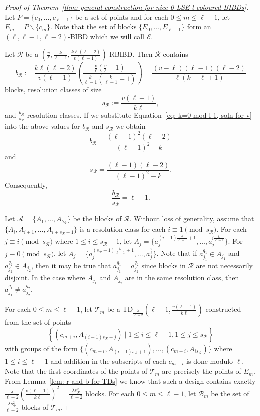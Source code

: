 \documentclass[12pt]{article}
\theoremstyle{definition}
\begin{document}
\begin{proof}[Proof of Theorem~\ref{thm: general construction for nice 0-LSE l-coloured BIBDs}]
    Let $P =\{c_0, \dots, c_{\ell-1}\}$ be a set of points and for each $0\leq m\leq \ell-1$, let $E_m=P\backslash\{c_m\}$. Note that the set of blocks $\{E_0, \dots, E_{\ell-1}\}$ form an $(\ell, \ell-1, \ell-2)$-BIBD which we will call $\mathcal{E}$.

    Let $\mathcal{R}$ be a $\left(\frac{v}{\ell}, \frac{k}{\ell-1}, \frac{k\ell(\ell-2)}{v(\ell-1)}\right)$-RBIBD. Then $\mathcal{R}$ contains \[b_{\mathcal{R}} := \frac{k\ell(\ell-2)}{v(\ell-1)}\left( \frac{\frac{v}{\ell}\left( \frac{v}{\ell} - 1\right)}{\frac{k}{\ell-1}\left( \frac{k}{\ell-1} - 1 \right)} \right) = \frac{(v-\ell)(\ell-1)(\ell-2)}{\ell(k-\ell+1)}\] blocks, resolution classes of size \[s_{\mathcal{R}} := \frac{v(\ell-1)}{k\ell},\] and $\frac{b_{\mathcal{R}}}{s_{\mathcal{R}}}$ resolution classes. If we substitute Equation~\eqref{eq: k=0 mod l-1, soln for v} into the above values for $b_{\mathcal{R}}$ and $s_{\mathcal{R}}$ we obtain \[b_{\mathcal{R}} = \frac{(\ell-1)^2(\ell-2)}{(\ell-1)^2 - k}\] and \[s_{\mathcal{R}} = \frac{(\ell-1)(\ell-2)}{(\ell-1)^2 - k}.\] Consequently, \[\frac{b_{\mathcal{R}}}{s_{\mathcal{R}}} = \ell -1.\]
    
    Let $\mathcal{A} = \{A_1, \dots, A_{b_{\mathcal{R}}}\}$ be the blocks of $\mathcal{R}$. Without loss of generality, assume that $\{A_i, A_{i+1}, \dots, A_{i + s_{\mathcal{R}} - 1}\}$ is a resolution class for each $i\equiv 1 \pmod{s_{\mathcal{R}}}$. For each $j\equiv i \pmod{s_{\mathcal{R}}}$ where $1\leq i\leq s_{\mathcal{R}} - 1$, let $A_j = \{a_j^{(i-1)\frac{k}{\ell-1} + 1}, \dots, a_j^{i\frac{k}{\ell-1}}\}$. For $j\equiv 0 \pmod{s_{\mathcal{R}}}$, let $A_j = \{a_j^{(s_{\mathcal{R}}-1)\frac{k}{\ell-1} + 1},\dots, a_j^{\frac{v}{\ell}}\}$. Note that if $a_{j_1}^{q_1} \in A_{j_1}$ and  $a_{j_2}^{q_2} \in A_{j_2}$, then it may be true that $a_{j_1}^{q_1} = a_{j_2}^{q_2}$ since blocks in $\mathcal{R}$ are not necessarily disjoint. In the case where $A_{j_1}$ and $A_{j_2}$ are in the same resolution class, then $a_{j_1}^{q_1} \neq a_{j_2}^{q_2}$.

    For each $0\leq m\leq \ell-1$, let $\mathcal{T}_m$ be a TD$_{\frac{\lambda}{\ell-2}}\left(\ell-1, \frac{v(\ell-1)}{k\ell}\right)$ constructed from the set of points \[\left\{ (c_{m+i},A_{(i-1)s_{\mathcal{R}} + j}) \mid 1\leq i \leq \ell-1, 1\leq j\leq s_{\mathcal{R}} \right\}\] with groups of the form $\{(c_{m+i},A_{(i-1)s_{\mathcal{R}} + 1}), \dots, (c_{m+i},A_{is_{\mathcal{R}}})\}$ where $1\leq i\leq \ell-1$ and addition in the subscripts of each $c_{m+i}$ is done modulo $\ell$. Note that the first coordinates of the points of $\mathcal{T}_m$ are precisely the points of $E_m$. From Lemma~\ref{lem: r and b for TDs} we know that such a design contains exactly $\frac{\lambda}{\ell-2}\left( \frac{v(\ell-1)}{k\ell} \right)^2 = \frac{\lambda s_{\mathcal{R}}^2}{\ell-2}$ blocks. For each $0\leq m\leq \ell-1$, let $\mathcal{B}_m$ be the set of $\frac{\lambda s_{\mathcal{R}}^2}{\ell-2}$ blocks of $\mathcal{T}_m$. 


\end{proof}
\end{document}
